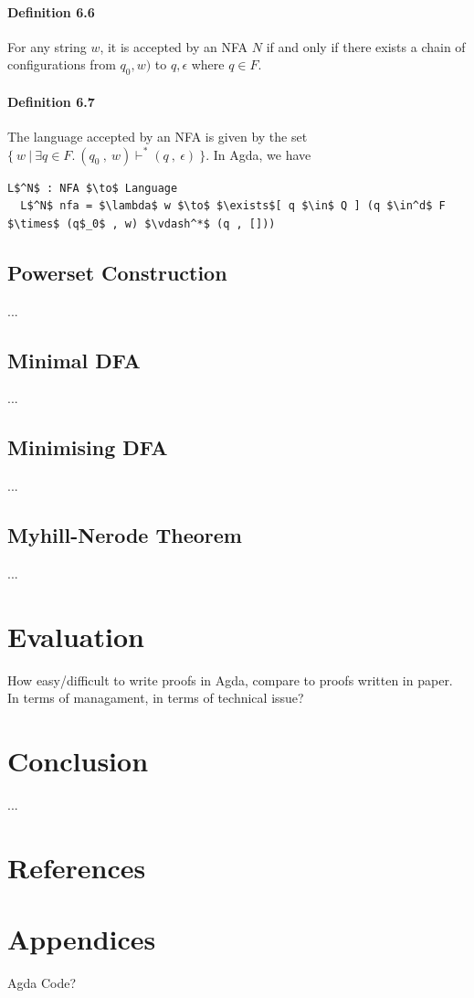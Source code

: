 \documentclass[twoside,openright,final]{bhamthesis}
\begin{document}
\paragraph{Definition 6.6} For any string \(w\), it is accepted by an NFA \(N\)
if and only if there exists a chain of configurations from \(q_0 ,
w)\) to \(q , \epsilon\) where \(q \in F\). 

\paragraph{Definition 6.7} The language accepted by an
NFA is given by the set \(\{\ w\ |\ \exists q\in F.\ (q_0\ ,\
w) \vdash^* (q\ ,\ \epsilon)\ \}\). In Agda, we have
\begin{lstlisting}[mathescape=true,aboveskip=0pt]
  L$^N$ : NFA $\to$ Language
  L$^N$ nfa = $\lambda$ w $\to$ $\exists$[ q $\in$ Q ] (q $\in^d$ F $\times$ (q$_0$ , w) $\vdash^*$ (q , []))
\end{lstlisting} 

\subsection{Powerset Construction}
\par ...

\subsection{Minimal DFA}
\par ...

\subsection{Minimising DFA}
\par ...

\subsection{Myhill-Nerode Theorem}
\par ...

\newpage
\section{Evaluation}
\par How easy/difficult to write proofs in Agda, compare to proofs written
in paper. In terms of managament, in terms of technical issue?

\newpage
\section{Conclusion}
\par ...

\newpage
\section*{References}



\newpage
\section*{Appendices}
Agda Code?
\end{document}
